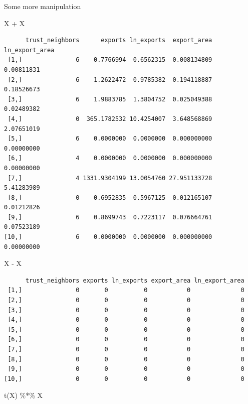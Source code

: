 \documentclass[
  letterpaper,
]{book}
\newenvironment{Shaded}{\begin{snugshade}}{\end{snugshade}}
\newcommand{\FunctionTok}[1]{\textcolor[rgb]{0.28,0.35,0.67}{#1}}
\newcommand{\NormalTok}[1]{\textcolor[rgb]{0.00,0.23,0.31}{#1}}
\newcommand{\SpecialCharTok}[1]{\textcolor[rgb]{0.37,0.37,0.37}{#1}}
\theoremstyle{definition}
\theoremstyle{definition}
\theoremstyle{plain}
\theoremstyle{definition}
\theoremstyle{plain}
\theoremstyle{plain}
\theoremstyle{remark}
\begin{document}
Some more manipulation

\begin{Shaded}
\begin{Highlighting}[]
\NormalTok{X }\SpecialCharTok{+}\NormalTok{ X}
\end{Highlighting}
\end{Shaded}

\begin{verbatim}
      trust_neighbors      exports ln_exports  export_area ln_export_area
 [1,]               6    0.7766994  0.6562315  0.008134809     0.00811831
 [2,]               6    1.2622472  0.9785382  0.194118887     0.18526673
 [3,]               6    1.9883785  1.3804752  0.025049388     0.02489382
 [4,]               0  365.1782532 10.4254007  3.648568869     2.07651019
 [5,]               6    0.0000000  0.0000000  0.000000000     0.00000000
 [6,]               4    0.0000000  0.0000000  0.000000000     0.00000000
 [7,]               4 1331.9304199 13.0054760 27.951133728     5.41283989
 [8,]               0    0.6952835  0.5967125  0.012165107     0.01212826
 [9,]               6    0.8699743  0.7223117  0.076664761     0.07523189
[10,]               6    0.0000000  0.0000000  0.000000000     0.00000000
\end{verbatim}

\begin{Shaded}
\begin{Highlighting}[]
\NormalTok{X }\SpecialCharTok{{-}}\NormalTok{ X}
\end{Highlighting}
\end{Shaded}

\begin{verbatim}
      trust_neighbors exports ln_exports export_area ln_export_area
 [1,]               0       0          0           0              0
 [2,]               0       0          0           0              0
 [3,]               0       0          0           0              0
 [4,]               0       0          0           0              0
 [5,]               0       0          0           0              0
 [6,]               0       0          0           0              0
 [7,]               0       0          0           0              0
 [8,]               0       0          0           0              0
 [9,]               0       0          0           0              0
[10,]               0       0          0           0              0
\end{verbatim}

\begin{Shaded}
\begin{Highlighting}[]
\FunctionTok{t}\NormalTok{(X) }\SpecialCharTok{\%*\%}\NormalTok{ X}
\end{Highlighting}
\end{Shaded}
\end{document}
